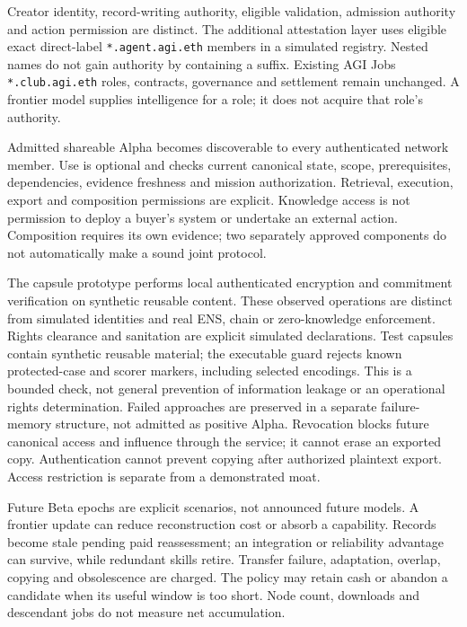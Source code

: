 \documentclass[11pt,letterpaper]{article}
\begin{document}
Creator identity, record-writing authority, eligible validation, admission authority and action permission are distinct. The additional attestation layer uses eligible exact direct-label \texttt{*.agent.agi.eth} members in a simulated registry. Nested names do not gain authority by containing a suffix. Existing AGI Jobs \texttt{*.club.agi.eth} roles, contracts, governance and settlement remain unchanged. A frontier model supplies intelligence for a role; it does not acquire that role's authority.

Admitted shareable Alpha becomes discoverable to every authenticated network member. Use is optional and checks current canonical state, scope, prerequisites, dependencies, evidence freshness and mission authorization. Retrieval, execution, export and composition permissions are explicit. Knowledge access is not permission to deploy a buyer's system or undertake an external action. Composition requires its own evidence; two separately approved components do not automatically make a sound joint protocol.

The capsule prototype performs local authenticated encryption and commitment verification on synthetic reusable content. These observed operations are distinct from simulated identities and real ENS, chain or zero-knowledge enforcement. Rights clearance and sanitation are explicit simulated declarations. Test capsules contain synthetic reusable material; the executable guard rejects known protected-case and scorer markers, including selected encodings. This is a bounded check, not general prevention of information leakage or an operational rights determination. Failed approaches are preserved in a separate failure-memory structure, not admitted as positive Alpha. Revocation blocks future canonical access and influence through the service; it cannot erase an exported copy. Authentication cannot prevent copying after authorized plaintext export. Access restriction is separate from a demonstrated moat.

Future Beta epochs are explicit scenarios, not announced future models. A frontier update can reduce reconstruction cost or absorb a capability. Records become stale pending paid reassessment; an integration or reliability advantage can survive, while redundant skills retire. Transfer failure, adaptation, overlap, copying and obsolescence are charged. The policy may retain cash or abandon a candidate when its useful window is too short. Node count, downloads and descendant jobs do not measure net accumulation.
\end{document}
